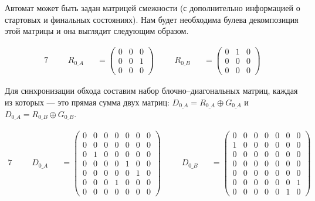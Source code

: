 \begin{example}
  Автомат может быть задан матрицей смежности (с дополнительно информацией о стартовых и финальных состояниях). Нам будет необходима булева декомпозиция этой матрицы и она выглядит следующим образом.

  \begin{alignat*}{7}
    & &&R_{0\_A} &&= \begin{pmatrix}
      0 & 0 & 0 \\
      0 & 0 & 1 \\
      0 & 0 & 0 
      \end{pmatrix} \ \ \ \ &&R_{0\_B} &&= \begin{pmatrix}
        0 & 1 & 0 \\
        0 & 0 & 0 \\
        0 & 0 & 0 
        \end{pmatrix}
    \end{alignat*}

  Для синхронизации обхода составим набор блочно--диагональных матриц, каждая из которых --- это прямая сумма двух матриц: $D_{0\_A} = R_{0\_A} \oplus G_{0\_A}$ и $D_{0\_A} = R_{0\_B} \oplus G_{0\_B}$.

  \begin{alignat*}{7}
    & &&D_{0\_A} &&= \begin{pmatrix}
      0 & 0 & 0 & 0 & 0 & 0 & 0 \\
      0 & 0 & 0 & 0 & 0 & 0 & 0 \\
      0 & 1 & 0 & 0 & 0 & 0 & 0 \\
      0 & 0 & 0 & 0 & 1 & 0 & 0 \\
      0 & 0 & 0 & 0 & 0 & 1 & 0 \\
      0 & 0 & 0 & 1 & 0 & 0 & 0 \\
      0 & 0 & 0 & 0 & 0 & 0 & 0 
      \end{pmatrix} \ \ \ \ &&D_{0\_B} &&= \begin{pmatrix}
        0 & 0 & 0 & 0 & 0 & 0 & 0 \\
        1 & 0 & 0 & 0 & 0 & 0 & 0 \\
        0 & 0 & 0 & 0 & 0 & 0 & 0 \\
        0 & 0 & 0 & 0 & 0 & 0 & 0 \\
        0 & 0 & 0 & 0 & 0 & 0 & 0 \\
        0 & 0 & 0 & 0 & 0 & 0 & 1 \\
        0 & 0 & 0 & 0 & 0 & 1 & 0 
        \end{pmatrix}
    \end{alignat*}


\end{example}
